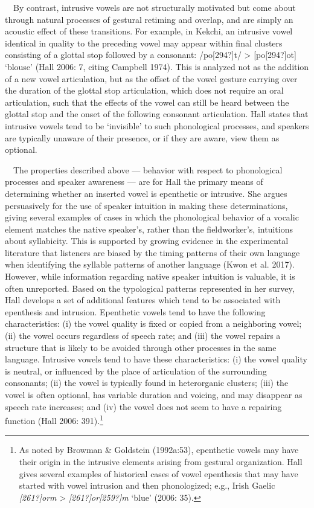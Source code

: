 \documentclass[12pt]{article}
\newenvironment{styleBody}{\renewcommand\baselinestretch{1.0}\setlength\leftskip{0in}\setlength\rightskip{0in plus 1fil}\setlength\parindent{0in}\setlength\parfillskip{0pt plus 1fil}\setlength\parskip{0in plus 1pt}\writerlistparindent\writerlistleftskip\leavevmode\normalfont\normalsize\fontsize{11pt}{13.2pt}\selectfont\mdseries\upshape\writerlistlabel\ignorespaces}{\unskip\vspace{0in plus 1pt}\par}
\newcommand\writerlistleftskip{}
\newcommand\writerlistparindent{}
\newcommand\writerlistlabel{}
\begin{document}
\begin{styleBody}
\ \ By contrast, intrusive vowels are not structurally motivated but come about through natural processes of gestural retiming and overlap, and are simply an acoustic effect of these transitions. For example, in Kekchi, an intrusive vowel identical in quality to the preceding vowel may appear within final clusters consisting of a glottal stop followed by a consonant: /po[294?]t/ {\textgreater} [po[294?]ot] ‘blouse’ (Hall 2006: 7, citing Campbell 1974). This is analyzed not as the addition of a new vowel articulation, but as the offset of the vowel gesture carrying over the duration of the glottal stop articulation, which does not require an oral articulation, such that the effects of the vowel can still be heard between the glottal stop and the onset of the following consonant articulation. Hall states that intrusive vowels tend to be ‘invisible’ to such phonological processes, and speakers are typically unaware of their presence, or if they are aware, view them as optional.
\end{styleBody}

\begin{styleBody}
\ \ The properties described above — behavior with respect to phonological processes and speaker awareness — are for Hall the primary means of determining whether an inserted vowel is epenthetic or intrusive. She argues persuasively for the use of speaker intuition in making these determinations, giving several examples of cases in which the phonological behavior of a vocalic element matches the native speaker’s, rather than the fieldworker’s, intuitions about syllabicity. This is supported by growing evidence in the experimental literature that listeners are biased by the timing patterns of their own language when identifying the syllable patterns of another language (Kwon et al. 2017). However, while information regarding native speaker intuition is valuable, it is often unreported. Based on the typological patterns represented in her survey, Hall develops a set of additional features which tend to be associated with epenthesis and intrusion. Epenthetic vowels tend to have the following characteristics: (i) the vowel quality is fixed or copied from a neighboring vowel; (ii) the vowel occurs regardless of speech rate; and (iii) the vowel repairs a structure that is likely to be avoided through other processes in the same language. Intrusive vowels tend to have these characteristics: (i) the vowel quality is neutral, or influenced by the place of articulation of the surrounding consonants; (ii) the vowel is typically found in heterorganic clusters; (iii) the vowel is often optional, has variable duration and voicing, and may disappear as speech rate increases; and (iv) the vowel does not seem to have a repairing function (Hall 2006: 391).\footnote{\textrm{As noted by Browman \& Goldstein (1992a:53), epenthetic vowels may have their origin in the intrusive elements arising from gestural organization. Hall gives several examples of historical cases of vowel epenthesis that may have started with vowel intrusion and then phonologized; e.g., Irish Gaelic }\textrm{\textit{[261?]orm}}\textrm{ {\textgreater} }\textrm{\textit{[261?]or[259?]m}}\textrm{ ‘blue’ (2006: 35).}}
\end{styleBody}
\end{document}
